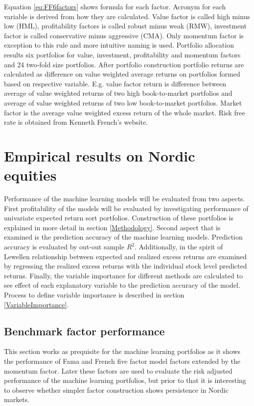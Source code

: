 \documentclass{article}
\begin{document}
Equation \ref{eq:FF6factors} shows formula for each factor. Acronym for each variable is derived from how they are calculated. Value factor is called high minus low (HML), profitability factors is called robust minus weak (RMW), investment factor is called conservative minus aggressive (CMA). Only momentum factor is exception to this rule and more intuitive naming is used. Portfolio allocation results six portfolios for value, investment, profitability and momentum factors and 24 two-fold size portfolios. After portfolio construction portfolio returns are calculated as difference on value weighted average returns on portfolios formed based on respective variable. E.g. value factor return is difference between average of value weighted returns of two high book-to-market portfolios and average of value weighted returns of two low book-to-market portfolios. Market factor is the average value weighted excess return of the whole market. Risk free rate is obtained from Kenneth French's website.

\section{Empirical results on Nordic equities}

Performance of the machine learning models will be evaluated from two aspects. First profitability of the models will be evaluated by investigating performance of univariate expected return sort portfolios. Construction of these portfolios is explained in more detail in section \ref{Methodology}. Second aspect that is examined is the prediction accuracy of the machine learning models. Prediction accuracy is evaluated by out-out sample $R^2$. Additionally, in the spirit of Lewellen \citeyear{lewellen2015} relationship between expected and realized excess returns are examined by regressing the realized excess returns with the individual stock level predicted returns. Finally, the variable importance for different methods are calculated to see effect of each explanatory variable to the prediction accuracy of the model. Process to define variable importance is described in section \ref{VariableImportance}.

\subsection{Benchmark factor performance}\label{BenchmarkFactorPerformance}

This section works as prequisite for the machine learning portfolios as it shows the performance of Fama and French five factor \citeyear{FAMA20151} model factors extended by the momentum factor.  Later these factors are used to evaluate the risk adjusted performance of the machine learning portfolios, but prior to that it is interesting to observe whether simpler factor construction shows persistence in Nordic markets. 
\end{document}
